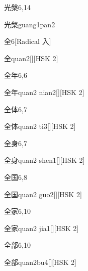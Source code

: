 \begin{entry}{光槃}{6,14}
  \begin{phonetics}{光槃}{guang1pan2}
  \end{phonetics}
\end{entry}

\begin{entry}{全}{6}[Radical 入]
  \begin{phonetics}{全}{quan2}[][HSK 2]
  \end{phonetics}
\end{entry}

\begin{entry}{全年}{6,6}
  \begin{phonetics}{全年}{quan2 nian2}[][HSK 2]
  \end{phonetics}
\end{entry}

\begin{entry}{全体}{6,7}
  \begin{phonetics}{全体}{quan2 ti3}[][HSK 2]
  \end{phonetics}
\end{entry}

\begin{entry}{全身}{6,7}
  \begin{phonetics}{全身}{quan2 shen1}[][HSK 2]
  \end{phonetics}
\end{entry}

\begin{entry}{全国}{6,8}
  \begin{phonetics}{全国}{quan2 guo2}[][HSK 2]
  \end{phonetics}
\end{entry}

\begin{entry}{全家}{6,10}
  \begin{phonetics}{全家}{quan2 jia1}[][HSK 2]
  \end{phonetics}
\end{entry}

\begin{entry}{全部}{6,10}
  \begin{phonetics}{全部}{quan2bu4}[][HSK 2]
  \end{phonetics}
\end{entry}

